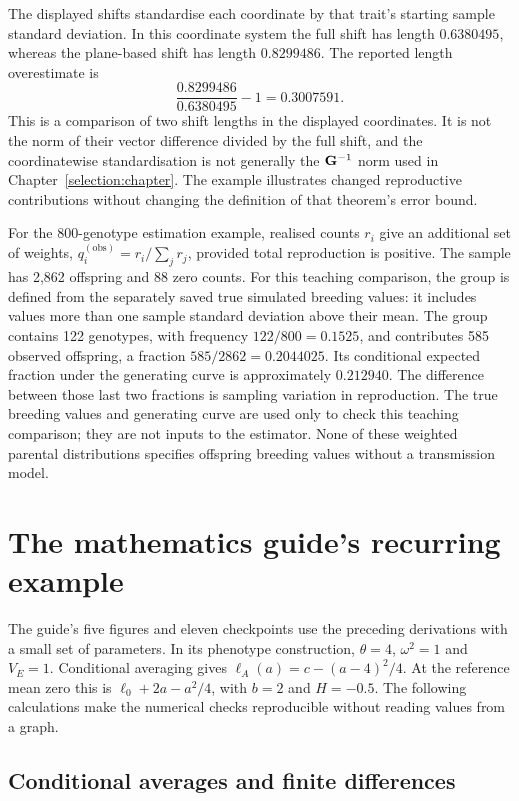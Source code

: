 The displayed shifts standardise each coordinate by that trait's starting sample standard deviation. In this coordinate system the full shift has length $0.6380495$, whereas the plane-based shift has length $0.8299486$. The reported length overestimate is
\[
 \frac{0.8299486}{0.6380495}-1=0.3007591.
\]
This is a comparison of two shift lengths in the displayed coordinates. It is not the norm of their vector difference divided by the full shift, and the coordinatewise standardisation is not generally the $\mathbf{G}^{-1}$ norm used in Chapter~\ref{selection:chapter}. The example illustrates changed reproductive contributions without changing the definition of that theorem's error bound.

For the 800-genotype estimation example, realised counts $r_i$ give an additional set of weights,
$q_i^{(\mathrm{obs})}=r_i/\sum_jr_j$, provided total reproduction is positive. The sample has 2,862 offspring and 88 zero counts. For this teaching comparison, the group is defined from the separately saved true simulated breeding values: it includes values more than one sample standard deviation above their mean. The group contains 122 genotypes, with frequency $122/800=0.1525$, and contributes 585 observed offspring, a fraction $585/2862=0.2044025$. Its conditional expected fraction under the generating curve is approximately $0.212940$. The difference between those last two fractions is sampling variation in reproduction. The true breeding values and generating curve are used only to check this teaching comparison; they are not inputs to the estimator. None of these weighted parental distributions specifies offspring breeding values without a transmission model.

\section{The mathematics guide's recurring example}
\label{worked:guide}

The guide's five figures and eleven checkpoints use the preceding derivations with a small set of parameters. In its phenotype construction, $\theta=4$, $\omega^2=1$ and $V_E=1$. Conditional averaging gives
$\ell_A(a)=c-(a-4)^2/4$. At the reference mean zero this is
$\ell_0+2a-a^2/4$, with $b=2$ and $H=-0.5$. The following calculations make the numerical checks reproducible without reading values from a graph.

\subsection{Conditional averages and finite differences}

